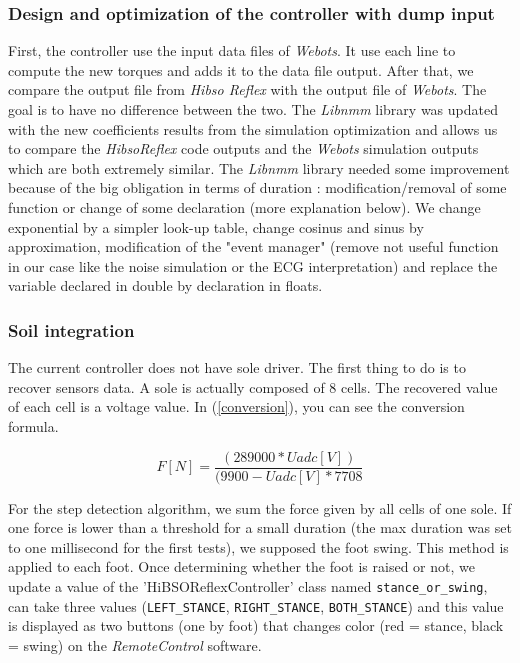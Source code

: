 \documentclass[a4paper,12pt]{article}
\begin{document}
\subsubsection{Design and optimization of the controller with dump input}

First, the controller use the input data files of \textit{Webots}. It use each line to compute the new torques and adds it to the data file output. After that, we compare the output file from \textit{Hibso Reflex} with the output file of \textit{Webots}. The goal is to have no difference between the two.
\medbreak
The \textit{Libnmm} library was updated with the new coefficients results from the simulation optimization and allows us to compare the \textit{HibsoReflex} code outputs and the \textit{Webots}  simulation outputs which are both extremely similar. 
\medbreak
The \textit{Libnmm} library needed some improvement because of the big obligation in terms of duration : modification/removal of some function or change of some declaration (more explanation below). We change exponential by a simpler look-up table, change cosinus and sinus by approximation, modification of the "event manager" (remove not useful function in our case like the noise simulation or the ECG interpretation) and replace the variable declared in double by declaration in floats.

\subsubsection{Soil integration}

The current controller does not have sole driver. The first thing to do is to recover sensors data. A sole is actually composed of 8 cells. The recovered value of each cell is a voltage value. In (\ref{conversion}), you can see the conversion formula.

\begin{equation}
	\label{conversion}
	F[N]=\frac{(289000*Uadc[V])}{(9900-Uadc[V]*7708}
\end{equation}

\medbreak
For the step detection algorithm, we sum the force given by all cells of one sole. If one force is lower than a threshold for a small duration (the max duration was set to one millisecond for the first tests), we supposed the foot swing. This method is applied to each foot.
\medbreak
Once determining whether the foot is raised or not, we update a value of the 'HiBSOReflexController' class named \verb|stance_or_swing|, can take three values (\verb|LEFT_STANCE|, \verb|RIGHT_STANCE|, \verb|BOTH_STANCE|) and this value is displayed as two buttons (one by foot) that changes color (red = stance, black = swing) on the \textit{RemoteControl} software.
\end{document}
